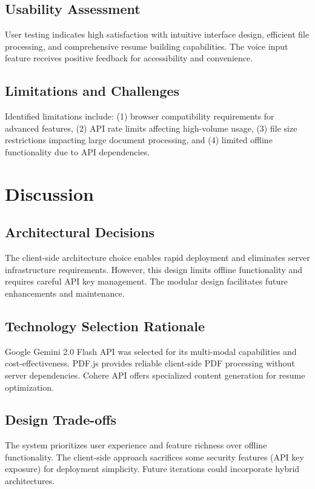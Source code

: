 \documentclass[conference]{IEEEtran}
\begin{document}
\subsection{Usability Assessment}
User testing indicates high satisfaction with intuitive interface design, efficient file processing, and comprehensive resume building capabilities. The voice input feature receives positive feedback for accessibility and convenience.

\subsection{Limitations and Challenges}
Identified limitations include: (1) browser compatibility requirements for advanced features, (2) API rate limits affecting high-volume usage, (3) file size restrictions impacting large document processing, and (4) limited offline functionality due to API dependencies.

\section{Discussion}

\subsection{Architectural Decisions}
The client-side architecture choice enables rapid deployment and eliminates server infrastructure requirements. However, this design limits offline functionality and requires careful API key management. The modular design facilitates future enhancements and maintenance.

\subsection{Technology Selection Rationale}
Google Gemini 2.0 Flash API was selected for its multi-modal capabilities and cost-effectiveness. PDF.js provides reliable client-side PDF processing without server dependencies. Cohere API offers specialized content generation for resume optimization.

\subsection{Design Trade-offs}
The system prioritizes user experience and feature richness over offline functionality. The client-side approach sacrifices some security features (API key exposure) for deployment simplicity. Future iterations could incorporate hybrid architectures.
\end{document}
